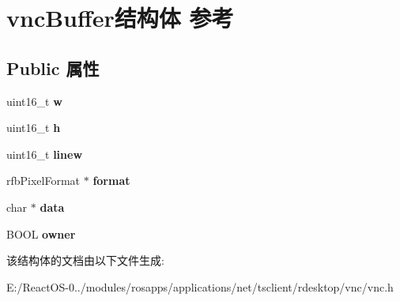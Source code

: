 \hypertarget{structvnc_buffer}{}\section{vnc\+Buffer结构体 参考}
\label{structvnc_buffer}
\subsection*{Public 属性}
\begin{DoxyCompactItemize}
\item 
\mbox{\label{structvnc_buffer_aef44cd0d15568c6a40b1f4003e09d3b7}} 
uint16\+\_\+t {\bfseries w}
\item 
\mbox{\label{structvnc_buffer_a8a8ad98eb97d633cb9bf8bbc5b53d16c}} 
uint16\+\_\+t {\bfseries h}
\item 
\mbox{\label{structvnc_buffer_a16a5f08ce8f225526192c80d23587499}} 
uint16\+\_\+t {\bfseries linew}
\item 
\mbox{\label{structvnc_buffer_a8dfeb76e6768a74e302a54e33701c8b6}} 
rfb\+Pixel\+Format $\ast$ {\bfseries format}
\item 
\mbox{\label{structvnc_buffer_a846b6e147a6970884eda235b214f045d}} 
char $\ast$ {\bfseries data}
\item 
\mbox{\label{structvnc_buffer_aab39e03e3c6bbd5120e65a3e5b3b7d40}} 
B\+O\+OL {\bfseries owner}
\end{DoxyCompactItemize}


该结构体的文档由以下文件生成\+:\begin{DoxyCompactItemize}
\item 
E\+:/\+React\+O\+S-\/0../modules/rosapps/applications/net/tsclient/rdesktop/vnc/vnc.\+h\end{DoxyCompactItemize}
